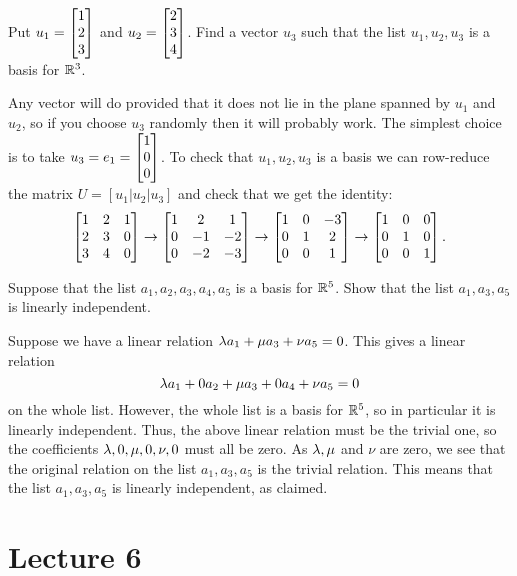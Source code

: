 \documentclass[a4paper]{amsart}
\renewenvironment{solution}{\SolutionInline}{\endSolutionInline}
\begin{document}
\begin{exercise}\label{ex-basis-iii}
 Put $u_1=\left[\begin{matrix} 1\\2\\3\end{matrix}\right]$ and $u_2=\left[\begin{matrix} 2\\3\\4\end{matrix}\right]$.  Find a vector
 $u_3$ such that the list $u_1,u_2,u_3$ is a basis for ${\mathbb{R}}^3$.
\end{exercise}
\begin{solution}
 Any vector will do provided that it does not lie in the plane spanned
 by $u_1$ and $u_2$, so if you choose $u_3$ randomly then it will
 probably work.  The simplest choice is to take
 $u_3=e_1=\left[\begin{matrix} 1\\0\\0\end{matrix}\right]$.  To check that $u_1,u_2,u_3$ is a basis
 we can row-reduce the matrix $U=[u_1|u_2|u_3]$ and check that we get
 the identity:
 \[ 
  \left[\begin{matrix} 1 & 2 & 1 \\
       2 & 3 & 0 \\
       3 & 4 & 0 \end{matrix}\right] 
  \to 
  \left[\begin{matrix} 1 & 2 & 1 \\
       0 &-1 &-2 \\
       0 &-2 &-3 \end{matrix}\right] 
  \to 
  \left[\begin{matrix} 1 & 0 &-3 \\
       0 & 1 & 2 \\
       0 & 0 & 1 \end{matrix}\right] 
  \to 
  \left[\begin{matrix} 1 & 0 & 0 \\
       0 & 1 & 0 \\
       0 & 0 & 1 \end{matrix}\right]. 
 \]
\end{solution}

\begin{exercise}\label{ex-basis-iv}
 Suppose that the list $a_1,a_2,a_3,a_4,a_5$ is a basis for ${\mathbb{R}}^5$.
 Show that the list $a_1,a_3,a_5$ is linearly independent.
\end{exercise}
\begin{solution}
 Suppose we have a linear relation $\lambda a_1 + \mu a_3 + \nu a_5=0$.
 This gives a linear relation
 \[ \lambda a_1 + 0 a_2 + \mu a_3 + 0 a_4 + \nu a_5 = 0 \]
 on the whole list.  However, the whole list is a basis for ${\mathbb{R}}^5$, so
 in particular it is linearly independent.  Thus, the above linear
 relation must be the trivial one, so the coefficients
 $\lambda,0,\mu,0,\nu,0$ must all be zero.  As $\lambda,\mu$ and $\nu$ are
 zero, we see that the original relation on the list $a_1,a_3,a_5$ is
 the trivial relation.  This means that the list $a_1,a_3,a_5$ is
 linearly independent, as claimed.
\end{solution}

\section{Lecture 6}
\end{document}
